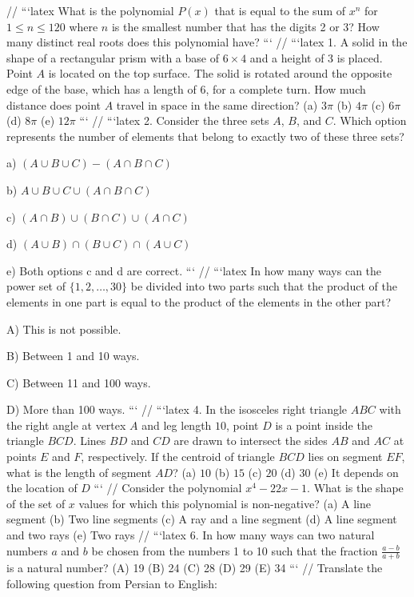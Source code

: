 //
```latex
What is the polynomial $P(x)$ that is equal to the sum of $x^n$ for $1 \leq n \leq 120$ where $n$ is the smallest number that has the digits 2 or 3? How many distinct real roots does this polynomial have?
```
//
```latex
1. A solid in the shape of a rectangular prism with a base of $6 \times 4$ and a height of 3 is placed. Point $A$ is located on the top surface. The solid is rotated around the opposite edge of the base, which has a length of 6, for a complete turn. How much distance does point $A$ travel in space in the same direction? 
(a) $3\pi$ \quad (b) $4\pi$ \quad (c) $6\pi$ \quad (d) $8\pi$ \quad (e) $12\pi$
```
//
```latex
2. Consider the three sets $A$, $B$, and $C$. Which option represents the number of elements that belong to exactly two of these three sets?

a) $(A \cup B \cup C) - (A \cap B \cap C)$

b) $A \cup B \cup C \cup (A \cap B \cap C)$

c) $(A \cap B) \cup (B \cap C) \cup (A \cap C)$

d) $(A \cup B) \cap (B \cup C) \cap (A \cup C)$

e) Both options c and d are correct.
```
//
```latex
In how many ways can the power set of $\{1, 2, \ldots, 30\}$ be divided into two parts such that the product of the elements in one part is equal to the product of the elements in the other part? 

A) This is not possible. 

B) Between 1 and 10 ways. 

C) Between 11 and 100 ways. 

D) More than 100 ways.
```
//
```latex
4. In the isosceles right triangle $ABC$ with the right angle at vertex $A$ and leg length $10$, point $D$ is a point inside the triangle $BCD$. Lines $BD$ and $CD$ are drawn to intersect the sides $AB$ and $AC$ at points $E$ and $F$, respectively. If the centroid of triangle $BCD$ lies on segment $EF$, what is the length of segment $AD$? 
(a) $10$ \quad (b) $15$ \quad (c) $20$ \quad (d) $30$ \quad (e) It depends on the location of $D$
```
//
Consider the polynomial $x^4 - 22x - 1$. What is the shape of the set of $x$ values for which this polynomial is non-negative? 
(a) A line segment 
(b) Two line segments 
(c) A ray and a line segment 
(d) A line segment and two rays 
(e) Two rays
//
```latex
6. In how many ways can two natural numbers $a$ and $b$ be chosen from the numbers 1 to 10 such that the fraction $\frac{a-b}{a+b}$ is a natural number? 
(A) 19 (B) 24 (C) 28 (D) 29 (E) 34
```
//
Translate the following question from Persian to English:


